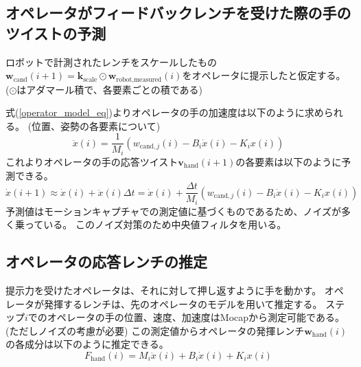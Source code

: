 \documentclass[uplatex]{jsarticle}
\begin{document}
\subsection{オペレータがフィードバックレンチを受けた際の手のツイストの予測}
ロボットで計測されたレンチをスケールしたもの$\bm{w}_{\text{cand}}(i+1) = \bm{k}_{\text{scale}} \odot \bm{w}_{\text{robot,measured}}(i)$をオペレータに提示したと仮定する。
($\odot$はアダマール積で、各要素ごとの積である)

式(\ref{operator_model_eq})よりオペレータの手の加速度は以下のように求められる。
(位置、姿勢の各要素について)
\begin{equation}
  \ddot{x}(i) = \frac{1}{M_i} (w_{\text{cand},j}(i) - B_i \dot{x}(i) - K_i x(i))
\end{equation}
これよりオペレータの手の応答ツイスト$\bm{v}_{\text{hand}}(i+1)$の各要素は以下のように予測できる。
\begin{equation}
  \dot{x}(i+1) \approx \dot{x}(i) + \ddot{x}(i) \Delta t = \dot{x}(i) + \frac{\Delta t}{M_i} (w_{\text{cand},j}(i) - B_i \dot{x}(i) - K_i x(i))
\end{equation}
予測値はモーションキャプチャでの測定値に基づくものであるため、ノイズが多く乗っている。
このノイズ対策のため中央値フィルタを用いる。

\subsection{オペレータの応答レンチの推定}
提示力を受けたオペレータは、それに対して押し返すように手を動かす。
オペレータが発揮するレンチは、先のオペレータのモデルを用いて推定する。
ステップ$i$でのオペレータの手の位置、速度、加速度はMocapから測定可能である。
(ただしノイズの考慮が必要)
この測定値からオペレータの発揮レンチ$\bm{w}_{\text{hand}}(i)$の各成分は以下のように推定できる。
\begin{equation}
  F_{\text{hand}}(i) = M_i \ddot{x}(i) + B_i \dot{x}(i) + K_i x(i)
\end{equation}
\end{document}
